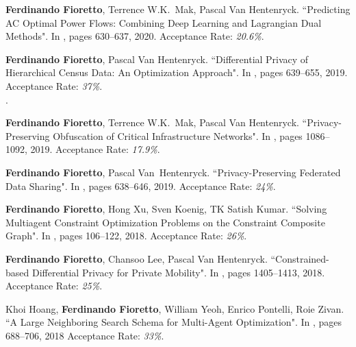 \item 
	{\bf Ferdinando Fioretto}, Terrence W.K.~Mak, Pascal Van Hentenryck.
	{``Predicting AC Optimal Power Flows: Combining Deep Learning and Lagrangian Dual Methods"}.
  	In \procAAAI, pages 630--637, 2020.
    Acceptance Rate: {\it 20.6\%}. %

\item 
	{\bf Ferdinando Fioretto}, Pascal Van Hentenryck. 
	{``Differential Privacy of Hierarchical Census Data: An Optimization Approach"}. In \procCP, pages 639--655, 2019. 
	Acceptance Rate: {\it 37\%}. \\
	.

\item 
	{\bf Ferdinando Fioretto}, Terrence W.K.~Mak, Pascal Van Hentenryck. 
	{``Privacy-Preserving Obfuscation of Critical Infrastructure Networks"}.
  	In \procIJCAI, pages 1086--1092, 2019.
    Acceptance Rate: {\it 17.9\%}. %

\item 
	{\bf Ferdinando Fioretto}, Pascal Van~Hentenryck.
	{``Privacy-Preserving Federated Data Sharing"}.
  	In \procAAMAS, pages 638--646, 2019.
    Acceptance Rate: {\it 24\%}. %

\item
	{\bf Ferdinando Fioretto}, Hong Xu, Sven Koenig, TK Satish Kumar. 
 	{``Solving Multiagent Constraint Optimization Problems on the Constraint Composite Graph"}. 
	In \procPRIMA, pages 106--122, 2018.
    Acceptance Rate: {\it 26\%}. %

\item
  	{\bf Ferdinando Fioretto}, Chansoo Lee, Pascal Van Hentenryck. 
  	{``Constrained-based Differential Privacy for Private Mobility"}. 
  	In \procAAMAS, pages 1405--1413, 2018.
    Acceptance Rate: {\it 25\%}. %

\item 
	Khoi Hoang, {\bf Ferdinando Fioretto}, William Yeoh, Enrico Pontelli, Roie Zivan. 
	{``A Large Neighboring Search Schema for Multi-Agent Optimization"}. 
	In \procCP, pages 688--706, 2018
    Acceptance Rate: {\it 33\%}. %

